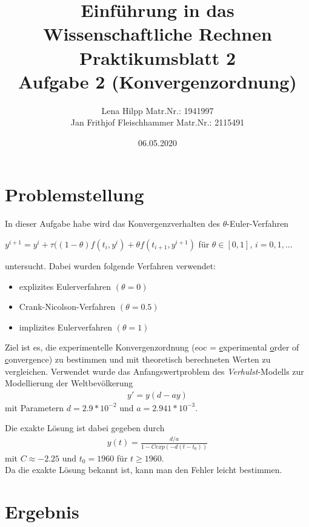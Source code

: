 \documentclass[11pt,a4paper]{article}
\title{Einf\"uhrung in das Wissenschaftliche Rechnen\\
  Praktikumsblatt 2\\
  Aufgabe 2 (Konvergenzordnung)}
\author{Lena Hilpp Matr.Nr.: 1941997\\Jan Frithjof Fleischhammer Matr.Nr.: 2115491}
\date{06.05.2020}
\begin{document}
  
  \maketitle
  
  \section*{Problemstellung}
  
  In dieser Aufgabe habe wird das Konvergenzverhalten des $\theta$-Euler-Verfahren
  \begin{center}
  	$y^{i+1}=y^i+\tau((1-\theta)f(t_i,y^i)+{\theta}f(t_{i+1},y^{i+1})$  f\"ur $\theta \in [0,1]$, $i = 0,1,...$
  \end{center}
  untersucht. Dabei wurden folgende Verfahren verwendet:
  \begin{itemize}
  	\item explizites Eulerverfahren $(\theta = 0)$
  	\item Crank-Nicolson-Verfahren $(\theta = 0.5)$
  	\item implizites Eulerverfahren $(\theta = 1)$
  \end{itemize}
  
  Ziel ist es, die experimentelle Konvergenzordnung (eoc = \underline{e}xperimental \underline{o}rder of \underline{c}onvergence) zu bestimmen und mit theoretisch berechneten Werten zu vergleichen. Verwendet wurde das Anfangswertproblem des \textit{Verhulst}-Modells zur Modellierung der Weltbev\"olkerung
  \begin{align*}
  	\tag{Verhulst}
  	y'=y(d-ay)
  \end{align*}
  mit Parametern $d=2.9*10^{-2}$ und $a=2.941*10^{-3}$.
  
  Die exakte L\"osung ist dabei gegeben durch
  \begin{align}
  	y(t)=\frac{d/a}{1-C exp(-d(t-t_0))}
  \end{align}
  mit $C\approx -2.25$ und $t_0=1960$ f\"ur $t\geq1960$.\\
  
  Da die exakte L\"osung bekannt ist, kann man den Fehler leicht bestimmen.
  
  \newpage
  
  \section*{Ergebnis}
\end{document}

